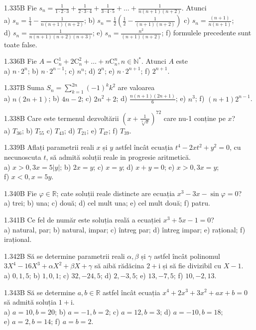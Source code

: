 \documentclass[11pt]{article}
\begin{document}
1.335B Fie $s_{n}=\frac{1}{1 \cdot 2 \cdot 3}+\frac{1}{2 \cdot 3 \cdot 4}+\frac{1}{3 \cdot 4 \cdot 5}+\ldots+\frac{1}{n(n+1)(n+2)}$. Atunci\\ a) $s_{n}=\frac{1}{4}-\frac{1}{n(n+1)(n+2)}$; b) $s_{n}=\frac{1}{2}\left(\frac{1}{2}-\frac{1}{(n+1)(n+2)}\right)$ c) $s_{n}=\frac{(n+1)}{n(n+1)}$;\\ d) $s_{n}=\frac{1}{n(n+1)(n+2)(n+3)}$; e) $s_{n}=\frac{n^{2}}{(n+1)(n+2)}$; f) formulele precedente sunt toate false.

1.336B Fie $A=\mathrm{C}_{n}^{1}+2 \mathrm{C}_{n}^{2}+\ldots+n \mathrm{C}_{n}^{n}, n \in \mathbb{N}^{*}$. Atunci $A$ este\\ a) $n \cdot 2^{n}$; b) $n \cdot 2^{n-1}$; c) $n^{n}$; d) $2^{n}$; e) $n \cdot 2^{n+1}$; f) $2^{n+1}$.

1.337B Suma $S_{n}=\sum_{k=1}^{2 n}(-1)^{k} k^{2}$ are valoarea\\ a) $n(2 n+1)$; b) $4 n-2$; c) $2 n^{2}+2$; d) $\frac{n(n+1)(2 n+1)}{6}$; e) $n^{3}$; f) $(n+1) 2^{n-1}$.

1.338B Care este termenul dezvoltării $\left(x+\frac{1}{\sqrt[3]{x}}\right)^{72}$ care nu-1 conține pe $x$?\\ a) $T_{36}$; b) $T_{55}$ c) $T_{43}$; d) $T_{21}$; e) $T_{47}$; f) $T_{39}$.

1.339B Aflați parametrii reali $x$ și $y$ astfel încât ecuația $t^{4}-2 x t^{2}+y^{2}=0$, cu necunoscuta $t$, să admită soluții reale in progresie aritmetică.\\ a) $x>0,3 x=5|y|$; b) $2 x=y$; c) $x=y$; d) $x+y=0$; e) $x>0,3 x=y$;\\ f) $x<0, x=5 y$.

1.340B Fie $\varphi \in \mathbb{R}$; cate soluții reale distincte are ecuația $x^{3}-3 x-\sin \varphi=0$?\\ a) trei; b) una; c) două; d) cel mult una; e) cel mult două; f) patru.

1.341B Ce fel de număr este soluția reală a ecuației $x^{3}+5 x-1=0$?\\ a) natural, par; b) natural, impar; c) întreg par; d) întreg impar; e) rațional; f) irațional.

1.342B Să se determine parametrii reali $\alpha, \beta$ și $\gamma$ astfel încât polinomul $3 X^{4}-16 X^{3}+\alpha X^{2}+\beta X+\gamma$ să aibă rădăcina $2+\mathrm{i}$ și să fie divizibil cu $X-1$.\\ a) $0,1,5$; b) $1,0,1$; c) $32,-24,5$; d) $2,-3,5$; e) $13,-7,5$; f) $10,-2,13$.

1.343B Să se determine $a, b \in \mathbb{R}$ astfel încât ecuația $x^{4}+2 x^{3}+3 x^{2}+a x+b=0$ să admită soluția $1+\mathrm{i}$.\\ a) $a=10, b=20$; b) $a=-1, b=2$; c) $a=12, b=3$; d) $a=-10, b=18$;\\ e) $a=2, b=14$; f) $a=b=2$.
\end{document}
